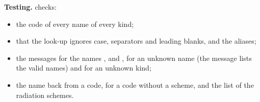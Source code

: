 \textbf{Testing.}  checks:
\begin{itemize}
  \item the code of every name of every kind;
  \item that the look-up ignores case, separators and leading blanks, and
    the aliases;
  \item the messages for the names ,  and
    , for an unknown name (the message lists the valid names)
    and for an unknown kind;
  \item the name back from a code,  for a code without a
    scheme, and the list of the radiation schemes.
\end{itemize}
